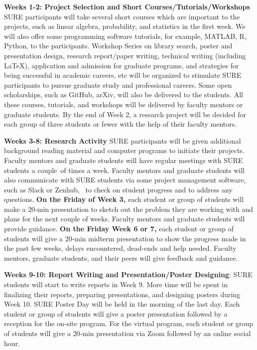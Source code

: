 \documentclass[11pt]{NSFamsart}
\begin{document}
\noindent \textbf{Weeks 1-2: Project Selection and Short Courses/Tutorials/Workshops}
SURE participants will take several short courses which are important to the projects, such as linear algebra, probability, and statistics in the first week. We will also offer some programming software tutorials, for example, MATLAB, R, Python, to the participants. 
Workshop Series on library search, poster and presentation design,
research report/paper writing, technical writing (including LaTeX), application and admission for
graduate programs, and strategies for being successful in academic careers, etc will be organized to
stimulate SURE participants to pursue graduate study and professional careers. Some open scholarships, such as GitHub, arXiv, will also be delivered to the students. All these courses, tutorials, and workshops will be delivered by faculty mentors or graduate students. 
By the end of Week 2, a research project will be decided for each group of three students or fewer with the help of their faculty mentors.

\noindent \textbf{Weeks 3-8: Research Activity}
SURE participants will be given additional background
reading material and computer programs to initiate their projects. Faculty mentors and graduate
students will have regular meetings with SURE students a couple of times a week. Faculty mentors and graduate students will also communicate with SURE students via some project management software, such as Slack or Zenhub,  to check on student progress and to address any questions. 
\textbf{On the Friday of Week 3,}
each student or group of students will make a 20-min presentation to sketch out the problem they are working with and plans for the next couple of weeks. Faculty mentors and
graduate students will provide guidance.
\textbf{On the Friday Week 6 or 7,}
each student or group of students will give a 20-min midterm presentation to show the progress made in the
past few weeks, delays encountered, dead-ends and help needed. Faculty mentors,
graduate students, and their peers will give feedback and guidance.

\noindent \textbf{Weeks 9-10: Report Writing and Presentation/Poster Designing}: SURE students will start to
write reports in Week 9. More time will be spent in finalizing their reports, preparing presentations, and designing posters during Week 10. SURE Poster Day will be held in the morning of the last day. Each student or group of students will give a poster presentation followed by a reception for the on-site program. For the virtual program, each student or group of students will give a 20-min presentation via Zoom followed by an online social hour.
\end{document}
